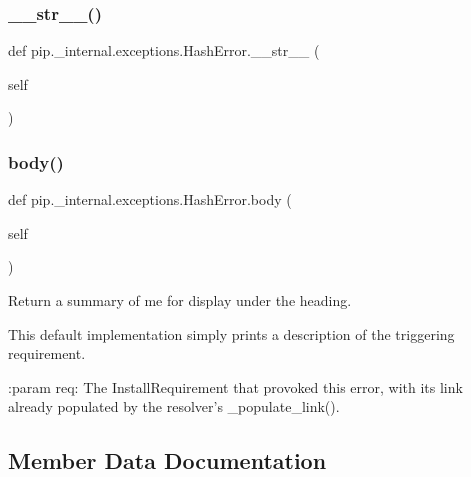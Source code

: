 \subsubsection{\texorpdfstring{\+\_\+\+\_\+str\+\_\+\+\_\+()}{\_\_str\_\_()}}
{\footnotesize\ttfamily def pip.\+\_\+internal.\+exceptions.\+Hash\+Error.\+\_\+\+\_\+str\+\_\+\+\_\+ (\begin{DoxyParamCaption}\item[{}]{self }\end{DoxyParamCaption})}

\mbox{\label{classpip_1_1__internal_1_1exceptions_1_1HashError_a9b89535522b4de9758f62636848d4f62}} 
\subsubsection{\texorpdfstring{body()}{body()}}
{\footnotesize\ttfamily def pip.\+\_\+internal.\+exceptions.\+Hash\+Error.\+body (\begin{DoxyParamCaption}\item[{}]{self }\end{DoxyParamCaption})}

\begin{DoxyVerb}Return a summary of me for display under the heading.

This default implementation simply prints a description of the
triggering requirement.

:param req: The InstallRequirement that provoked this error, with
    its link already populated by the resolver's _populate_link().\end{DoxyVerb}
 

\subsection{Member Data Documentation}
\mbox{\label{classpip_1_1__internal_1_1exceptions_1_1HashError_a8dc528f839ced7bff0f8909445b48b1b}} 
